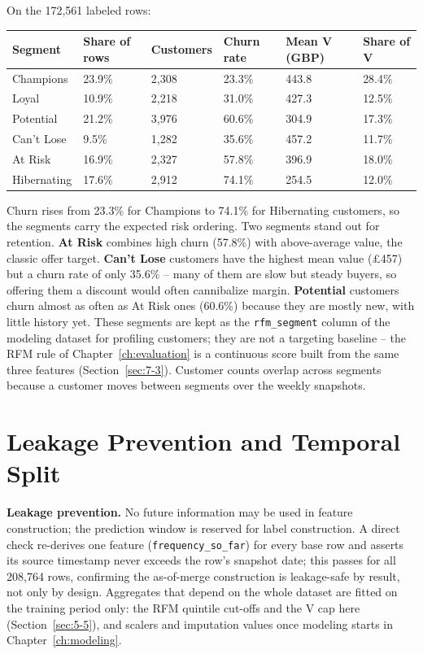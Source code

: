 On the 172,561 labeled rows:

\begin{center}
\begin{tabular}{@{}p{2.6cm}p{1.8cm}p{1.8cm}p{1.8cm}p{2.2cm}p{2.2cm}@{}}
    \toprule
    Segment & Share of rows & Customers & Churn rate & Mean V (GBP) & Share of V \\
    \midrule
    Champions & 23.9\% & 2,308 & 23.3\% & 443.8 & 28.4\% \\
    Loyal & 10.9\% & 2,218 & 31.0\% & 427.3 & 12.5\% \\
    Potential & 21.2\% & 3,976 & 60.6\% & 304.9 & 17.3\% \\
    Can't Lose & 9.5\% & 1,282 & 35.6\% & 457.2 & 11.7\% \\
    At Risk & 16.9\% & 2,327 & 57.8\% & 396.9 & 18.0\% \\
    Hibernating & 17.6\% & 2,912 & 74.1\% & 254.5 & 12.0\% \\
    \bottomrule
\end{tabular}
\end{center}

Churn rises from 23.3\% for Champions to 74.1\% for Hibernating customers, so the segments carry the expected risk ordering. Two segments stand out for retention. \textbf{At Risk} combines high churn (57.8\%) with above-average value, the classic offer target. \textbf{Can't Lose} customers have the highest mean value (\pounds457) but a churn rate of only 35.6\% -- many of them are slow but steady buyers, so offering them a discount would often cannibalize margin. \textbf{Potential} customers churn almost as often as At Risk ones (60.6\%) because they are mostly new, with little history yet. These segments are kept as the \texttt{rfm\_segment} column of the modeling dataset for profiling customers; they are not a targeting baseline -- the RFM rule of Chapter~\ref{ch:evaluation} is a continuous score built from the same three features (Section~\ref{sec:7-3}). Customer counts overlap across segments because a customer moves between segments over the weekly snapshots.

\section{Leakage Prevention and Temporal Split}
\label{sec:5-6}

\textbf{Leakage prevention.} No future information may be used in feature construction; the prediction window is reserved for label construction. A direct check re-derives one feature (\texttt{frequency\_so\_far}) for every base row and asserts its source timestamp never exceeds the row's snapshot date; this passes for all 208,764 rows, confirming the as-of-merge construction is leakage-safe by result, not only by design. Aggregates that depend on the whole dataset are fitted on the training period only: the RFM quintile cut-offs and the V cap here (Section~\ref{sec:5-5}), and scalers and imputation values once modeling starts in Chapter~\ref{ch:modeling}.

